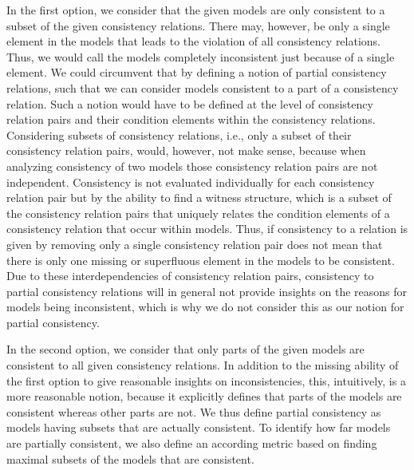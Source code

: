 In the first option, we consider that the given models are only consistent to a subset of the given consistency relations.
There may, however, be only a single element in the models that leads to the violation of all consistency relations.
Thus, we would call the models completely inconsistent just because of a single element.
We could circumvent that by defining a notion of partial consistency relations, such that we can consider models consistent to a part of a consistency relation.
Such a notion would have to be defined at the level of consistency relation pairs and their condition elements within the consistency relations.
Considering subsets of consistency relations, i.e., only a subset of their consistency relation pairs, would, however, not make sense, because when analyzing consistency of two models those consistency relation pairs are not independent.
Consistency is not evaluated individually for each consistency relation pair but by the ability to find a witness structure, which is a subset of the consistency relation pairs that uniquely relates the condition elements of a consistency relation that occur within models.
Thus, if consistency to a relation is given by removing only a single consistency relation pair does not mean that there is only one missing or superfluous element in the models to be consistent.
Due to these interdependencies of consistency relation pairs, consistency to partial consistency relations will in general not provide insights on the reasons for models being inconsistent, which is why we do not consider this as our notion for partial consistency.

In the second option, we consider that only parts of the given models are consistent to all given consistency relations.
In addition to the missing ability of the first option to give reasonable insights on inconsistencies, this, intuitively, is a more reasonable notion, because it explicitly defines that parts of the models are consistent whereas other parts are not.
We thus define partial consistency as models having subsets that are actually consistent.
To identify how far models are partially consistent, we also define an according metric based on finding maximal subsets of the models that are consistent.

